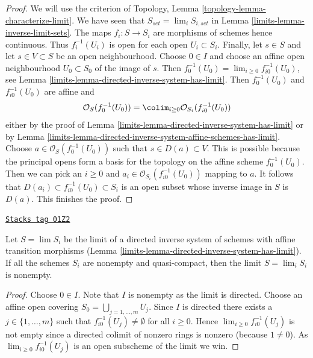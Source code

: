 \begin{proof}

We will use the criterion of
Topology, Lemma \ref{topology-lemma-characterize-limit}.
We have seen that $S_{set} = \lim_i S_{i, set}$ in
Lemma \ref{limits-lemma-inverse-limit-sets}.
The maps $f_i : S \to S_i$ are morphisms of schemes
hence continuous. Thus $f_i^{-1}(U_i)$ is open for each
open $U_i \subset S_i$. Finally,
let $s \in S$ and let $s \in V \subset S$ be an open
neighbourhood. Choose $0 \in I$ and choose an
affine open neighbourhood $U_0 \subset S_0$ of the image of $s$.
Then $f_0^{-1}(U_0) = \lim_{i \geq 0} f_{i0}^{-1}(U_0)$, see
Lemma \ref{limits-lemma-directed-inverse-system-has-limit}.
Then $f_0^{-1}(U_0)$ and $f_{i0}^{-1}(U_0)$ are affine and
$$
\mathcal{O}_S(f_0^{-1}(U_0)) =
\colim_{i \geq 0} \mathcal{O}_{S_i}(f_{i0}^{-1}(U_0))
$$
either by the proof of
Lemma \ref{limits-lemma-directed-inverse-system-has-limit}
or by
Lemma \ref{limits-lemma-directed-inverse-system-affine-schemes-has-limit}.
Choose $a \in \mathcal{O}_S(f_0^{-1}(U_0))$ such that
$s \in D(a) \subset V$. This is possible because the principal
opens form a basis for the topology on the affine scheme $f_0^{-1}(U_0)$.
Then we can pick an $i \geq 0$ and
$a_i \in \mathcal{O}_{S_i}(f_{i0}^{-1}(U_0))$ mapping to $a$.
It follows that $D(a_i) \subset f_{i0}^{-1}(U_0) \subset S_i$
is an open subset whose inverse image in $S$ is $D(a)$.
This finishes the proof.
\end{proof}

\begin{lemma}
\label{limits-lemma-limit-nonempty}
\href{https://stacks.math.columbia.edu/tag/01Z2}{\texttt{Stacks tag 01Z2}}

Let $S = \lim S_i$ be the limit of a directed inverse system
of schemes with affine transition morphisms
(Lemma \ref{limits-lemma-directed-inverse-system-has-limit}).
If all the schemes $S_i$ are nonempty and quasi-compact,
then the limit $S = \lim_i S_i$ is nonempty.
\end{lemma}

\begin{proof}
Choose $0 \in I$. Note that $I$ is nonempty as the limit is directed.
Choose an affine open covering $S_0 = \bigcup_{j = 1, \ldots, m} U_j$.
Since $I$ is directed there exists a $j \in \{1, \ldots, m\}$
such that $f_{i0}^{-1}(U_j) \not = \emptyset$ for all
$i \geq 0$. Hence $\lim_{i \geq 0} f_{i0}^{-1}(U_j)$ is not
empty since a directed colimit of nonzero rings is nonzero
(because $1 \not = 0$). As $\lim_{i \geq 0} f_{i0}^{-1}(U_j)$
is an open subscheme of the limit we win.
\end{proof}

